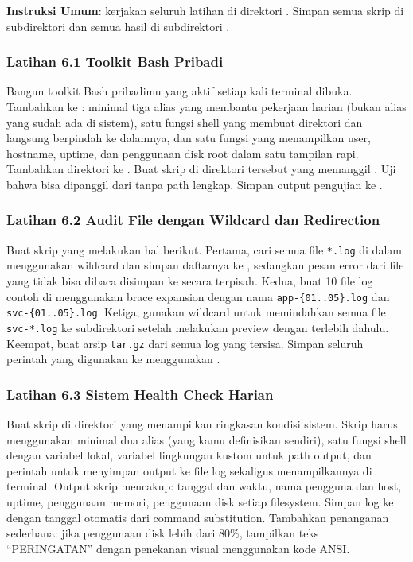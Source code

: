 \textbf{Instruksi Umum}: kerjakan seluruh latihan di direktori
. Simpan semua skrip di subdirektori
 dan semua hasil di subdirektori .

\subsubsection*{Latihan 6.1 Toolkit Bash Pribadi}
Bangun toolkit Bash pribadimu yang aktif setiap kali terminal dibuka.
Tambahkan ke : minimal tiga alias yang membantu pekerjaan
harian (bukan alias yang sudah ada di sistem), satu fungsi shell
 yang membuat direktori dan langsung berpindah ke dalamnya,
dan satu fungsi  yang menampilkan user, hostname,
uptime, dan penggunaan disk root dalam satu tampilan rapi. Tambahkan
direktori  ke . Buat skrip
 di direktori tersebut yang memanggil
. Uji bahwa  bisa dipanggil dari
 tanpa path lengkap. Simpan output pengujian ke
.


\subsubsection*{Latihan 6.2 Audit File dengan Wildcard dan Redirection}
Buat skrip  yang melakukan hal berikut. Pertama, cari
semua file \texttt{*.log} di dalam  menggunakan wildcard
dan simpan daftarnya ke , sedangkan pesan
error dari file yang tidak bisa dibaca disimpan ke 
secara terpisah. Kedua, buat 10 file log contoh di
 menggunakan brace expansion dengan nama
\texttt{app-\{01..05\}.log} dan \texttt{svc-\{01..05\}.log}. Ketiga,
gunakan wildcard untuk memindahkan semua file \texttt{svc-*.log} ke
subdirektori  setelah melakukan preview dengan 
terlebih dahulu. Keempat, buat arsip \texttt{tar.gz} dari semua log yang
tersisa. Simpan seluruh perintah yang digunakan ke
 menggunakan .


\subsubsection*{Latihan 6.3 Sistem Health Check Harian}
Buat skrip  di direktori  yang menampilkan
ringkasan kondisi sistem. Skrip harus menggunakan minimal dua alias
(yang kamu definisikan sendiri), satu fungsi shell dengan variabel lokal,
variabel lingkungan kustom untuk path output, dan perintah 
untuk menyimpan output ke file log sekaligus menampilkannya di terminal.
Output skrip mencakup: tanggal dan waktu, nama pengguna dan host, uptime,
penggunaan memori, penggunaan disk setiap filesystem. Simpan log ke
 dengan tanggal otomatis dari
command substitution. Tambahkan penanganan sederhana: jika penggunaan
disk lebih dari 80\%, tampilkan teks ``PERINGATAN'' dengan penekanan visual
menggunakan kode ANSI.


%
